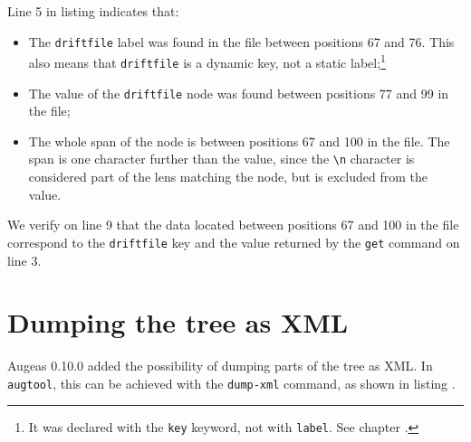 Line 5 in listing  indicates that:

\begin{itemize}
\item
  The \verb!driftfile! label was found in the file between positions 67 and 76. This also means that \verb!driftfile! is a dynamic key, not a static label;\footnote{It was declared with the \verb!key! keyword, not with \verb!label!. See chapter .}
\item
  The value of the \verb!driftfile! node was found between positions 77 and 99 in the file;
\item
  The whole span of the node is between positions 67 and 100 in the file. The span is one character further than the value, since the \verb!\n! character is considered part of the lens matching the node, but is excluded from the value.
\end{itemize}

We verify on line 9 that the data located between positions 67 and 100 in the file correspond to the \verb!driftfile! key and the value returned by the \verb!get! command on line 3.



\section{Dumping the tree as XML}

Augeas 0.10.0 added the possibility of dumping parts of the tree as XML. In \verb!augtool!, this can be achieved with the \verb!dump-xml! command, as shown in listing .




